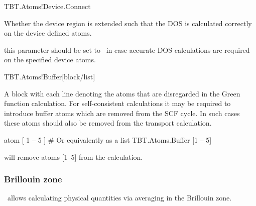 \begin{fdflogicalF}{TBT.Atoms!Device.Connect}
  
  Whether the device region is extended such that the DOS is
  calculated correctly on the device defined atoms.

  \note this parameter should be set to \fdftrue\ in case accurate DOS
  calculations are required on the specified device atoms. 

\end{fdflogicalF}

\begin{fdfentry}{TBT.Atoms!Buffer}[block/list]%

  A block with each line denoting the atoms that are disregarded in
  the Green function calculation.
  For self-consistent calculations it may be required to introduce
  buffer atoms which are removed from the SCF cycle. In such cases
  these atoms should also be removed from the transport calculation.
  \begin{fdfexample}
       atom [ 1 -- 5 ]
    # Or equivalently as a list   
    TBT.Atoms.Buffer [1 -- 5]
  \end{fdfexample}
  will remove atoms [1--5] from the calculation.
  
\end{fdfentry}


\subsubsection{Brillouin zone}

\tbtrans\ allows calculating physical quantities via averaging in the
Brillouin zone. 

